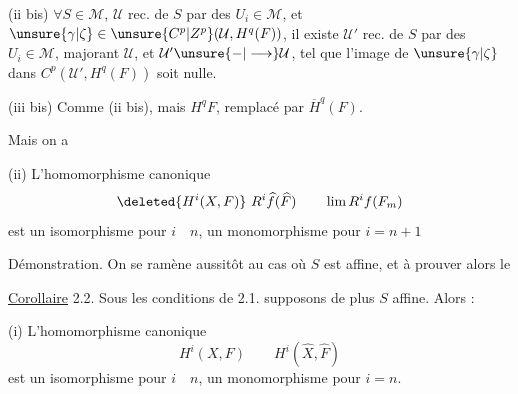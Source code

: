 (ii bis) $\forall S\in\mathcal M$, $\mathcal U$ rec. de $S$ par des $U_i\in\mathcal M$,
et $\unsure{\gamma|\zeta}\in\unsure{C^p|Z^p}(\mathcal U,H^q(F))$,
il existe $\mathcal U'$ rec. de $S$ par des $U_i\in\mathcal M$, majorant $\mathcal U$,
 et $\mathcal U'\unsure{-|\longrightarrow}\mathcal U$, tel que l'image de
$\unsure{\gamma|\zeta}$ dans $C^p(\mathcal U',H^q(F))$ soit nulle.

(iii bis) \deleted{$\unsure{\Leftarrow|\Leftrightarrow}$} Comme (ii bis), mais $H^qF$,
remplacé par $\overline H^q(F)$.

Mais on a


(ii) L'homomorphisme canonique
\[
\deleted{H^i(X,F)}\ R^i\widehat f(\widehat F)\qquad \lim R^if(F_m)
\]
est un isomorphisme pour $i\quad n$, un monomorphisme pour $i=n+1$ \deleted{\unsure{;}}

Démonstration. On se ramène aussitôt au cas où $S$ est affine, et à prouver alors le

\uline{Corollaire} 2.2. Sous les conditions de 2.1. supposons de plus $S$ affine.
Alors :

(i) L'homomorphisme canonique
\[
H^i(X,F)\qquad H^i(\widehat X,\widehat F)
\]
est un isomorphisme pour $i\quad n$, un monomorphisme pour $i=n$.

